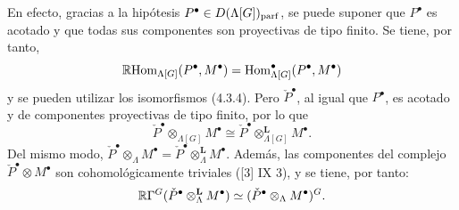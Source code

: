 En efecto, gracias a la hipótesis $P^\bullet\in D(\Lambda[G])_{\mathrm{parf}}$, se puede suponer que $P^\bullet$ es acotado y que todas sus componentes son proyectivas de tipo finito. Se tiene, por tanto,
\[
\mathbb{R}\mathrm{Hom}_{\Lambda[G]}(P^\bullet,M^\bullet)=\operatorname{Hom}_{\Lambda[G]}^\bullet(P^\bullet,M^\bullet)
\]
y se pueden utilizar los isomorfismos (4.3.4). Pero $\check P^\bullet$, al igual que $P^\bullet$, es acotado y de componentes proyectivas de tipo finito, por lo que
\[
\check P^\bullet\otimes_{\Lambda[G]}M^\bullet\cong \check P^\bullet\otimes_{\Lambda[G]}^{\mathbf L}M^\bullet.
\]
Del mismo modo, $\check P^\bullet\otimes_\Lambda M^\bullet=\check P^\bullet\otimes_\Lambda^{\mathbf L}M^\bullet$. Además, las componentes del complejo $\check P^\bullet\otimes M^\bullet$ son cohomológicamente triviales ([3] IX 3), y se tiene, por tanto:
\[
\mathbb{R}\Gamma^G(\check P^\bullet\otimes_\Lambda^{\mathbf L}M^\bullet)\simeq (\check P^\bullet\otimes_\Lambda M^\bullet)^G.
\]
